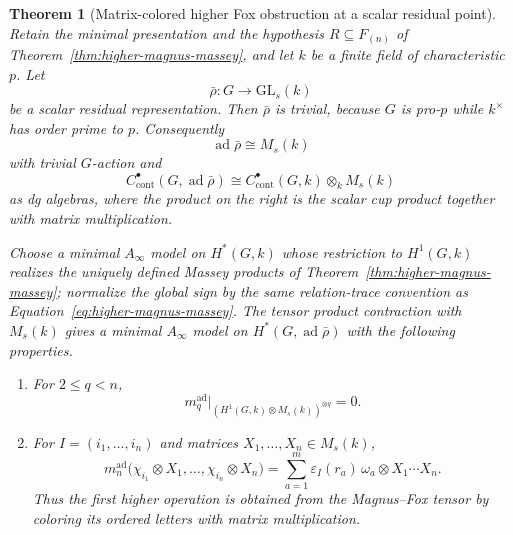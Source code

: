 \documentclass[11pt]{article}
\newtheorem{theorem}{Theorem}[section]
\theoremstyle{definition}
\begin{document}
\begin{theorem}[Matrix-colored higher Fox obstruction at a scalar residual point]\label{thm:scalar-magnus-deformation}
Retain the minimal presentation and the hypothesis $R\subseteq F_{(n)}$ of
Theorem~\ref{thm:higher-magnus-massey}, and let $k$ be a finite field of
characteristic $p$.  Let
\[
 \bar\rho:G\longrightarrow\mathrm{GL}_s(k)
\]
be a scalar residual representation.  Then $\bar\rho$ is trivial, because
$G$ is pro-$p$ while $k^\times$ has order prime to $p$.  Consequently
\[
 \operatorname{ad}\bar\rho\cong M_s(k)
\]
with trivial $G$-action and
\begin{equation}\label{eq:scalar-adjoint-tensor-dga}
 C^\bullet_{\mathrm{cont}}(G,\operatorname{ad}\bar\rho)
 \cong
 C^\bullet_{\mathrm{cont}}(G,k)\otimes_k M_s(k)
\end{equation}
as dg algebras, where the product on the right is the scalar cup product
together with matrix multiplication.

Choose a minimal $A_\infty$ model on $H^\ast(G,k)$ whose restriction to
$H^1(G,k)$ realizes the uniquely defined Massey products of
Theorem~\ref{thm:higher-magnus-massey}; normalize the global sign by the same
relation-trace convention as Equation~\eqref{eq:higher-magnus-massey}.  The
tensor product contraction with $M_s(k)$ gives a minimal $A_\infty$ model on
$H^\ast(G,\operatorname{ad}\bar\rho)$ with the following properties.
\begin{enumerate}[label=\textnormal{(\roman*)}]
\item For $2\le q<n$,
\[
 m_q^{\operatorname{ad}}
 \big|_{(H^1(G,k)\otimes M_s(k))^{\otimes q}}=0.
\]

\item For $I=(i_1,\ldots,i_n)$ and matrices $X_1,\ldots,X_n\in M_s(k)$,
\begin{equation}\label{eq:matrix-colored-higher-fox}
 m_n^{\operatorname{ad}}
 \bigl(\chi_{i_1}\otimes X_1,\ldots,\chi_{i_n}\otimes X_n\bigr)
 =
 \sum_{a=1}^{m}
 \varepsilon_I(r_a)\,\omega_a\otimes X_1\cdots X_n.
\end{equation}
Thus the first higher operation is obtained from the Magnus--Fox tensor by
coloring its ordered letters with matrix multiplication.


\end{enumerate}
\end{theorem}
\end{document}

